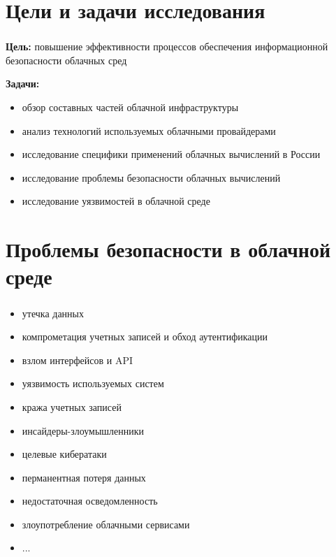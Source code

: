 
\frame[plain]{\titlepage} %


\section{Цели и задачи исследования}

\begin{frame}
\frametitle{\insertsection}

\textbf{Цель:} повышение эффективности процессов обеспечения информационной безопасности облачных сред

\vspace{\baselineskip}

\textbf{Задачи:}
\begin{itemize}
    \item обзор составных частей облачной инфраструктуры
    \item анализ технологий используемых облачными провайдерами
    \item исследование специфики применений облачных вычислений в России
    \item исследование проблемы безопасности облачных вычислений
    \item исследование уязвимостей в облачной среде
\end{itemize}
\end{frame}


\section{Проблемы безопасности в облачной среде}

\begin{frame}
\frametitle{\insertsection}

\begin{itemize}
    \item утечка данных
    \item компрометация учетных записей и обход аутентификации
    \item взлом интерфейсов и API
    \item уязвимость используемых систем
    \item кража учетных записей
    \item инсайдеры-злоумышленники
    \item целевые кибератаки
    \item перманентная потеря данных
    \item недостаточная осведомленность
    \item злоупотребление облачными сервисами
    \item ...
\end{itemize}
\end{frame}


